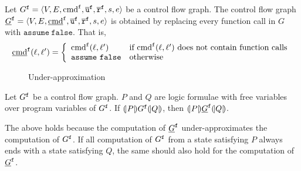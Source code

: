
Let $G^{\mathtt{{f}}} = \langle V, E, \textmd{cmd}^{\mathtt{{f}}}, \overline{\texttt{u}}^{\mathtt{{f}}}, \overline{\texttt{r}}^{\mathtt{{f}}},s,e \rangle$ be a control flow
graph. The control flow graph $\underline{G}^{\mathtt{{f}}} = \langle V, E,
\underline{\textmd{cmd}}^{\mathtt{{f}}}, \overline{\texttt{u}}^{\mathtt{{f}}}, \overline{\texttt{r}}^{\mathtt{{f}}},s,e \rangle$ is obtained by replacing every
function call in $G$ with $\mathtt{assume\ false}$. That is,
\begin{equation*}
  \underline{\textmd{cmd}}^{\mathtt{{f}}} (\ell, \ell') =
  \left\{
    \begin{array}{ll}
      \textmd{cmd}^{\mathtt{{f}}} (\ell, \ell') & 
      \textmd{if } \textmd{cmd}^{\mathtt{{f}}} (\ell, \ell') 
      \textmd{ does not contain function calls}\\
      \mathtt{assume\ false} &
      \textmd{otherwise}
    \end{array}
  \right.
\end{equation*}

\begin{figure}[t]
  \centering

  \caption{Under-approximation}
  \label{figure:under-approximation}
\end{figure}

\begin{proposition}
  Let $G^{\mathtt{{f}}}$ be a control flow graph. $P$ and $Q$ are logic formulae with
  free variables over program variables of $G^{\mathtt{{f}}}$. If $(\!| {P} |\!)
  G^{\mathtt{{f}}} (\!| {Q} |\!)$, then 
  $(\!| {P} |\!) \underline{G}^{\mathtt{{f}}} (\!| {Q} |\!)$.
\end{proposition}
The above holds because the computation of $\underline{G}^{\mathtt{{f}}}$ under-approximates the computation of $G^{\mathtt{{f}}}$. If all computation of $G^{\mathtt{{f}}}$ from a state satisfying $P$ always ends with a state satisfying $Q$, the same should also hold for the computation of $\underline{G}^{\mathtt{{f}}}$.
